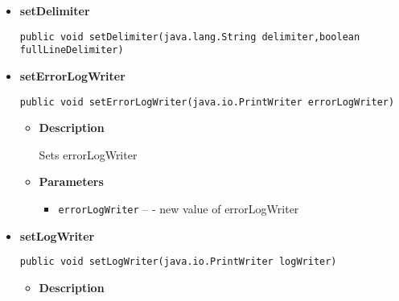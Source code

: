 \documentclass[
11pt, %
a4paper, %
oneside, %
headinclude,footinclude, %
BCOR5mm, %
]{scrartcl}
\begin{document}
\begin{appendices}
{{{{{{{{{{{{{{\begin{itemize}
{\begin{itemize}
{runs the SQL script, which is read in using Reader
}
\item{
{\bf  Parameters}
  \begin{itemize}
   \item{
\texttt{reader} -- - source of the script}
  \end{itemize}
}%
\item{{\bf  Throws}
}%
\end{itemize}
}%
\item{ 
\hypertarget{kitordersystem.ScriptReader.setDelimiter(java.lang.String, boolean)}{{\bf  setDelimiter}\\}
\begin{lstlisting}[frame=none]
public void setDelimiter(java.lang.String delimiter,boolean fullLineDelimiter)\end{lstlisting} %
}%
\item{ 
\hypertarget{kitordersystem.ScriptReader.setErrorLogWriter(java.io.PrintWriter)}{{\bf  setErrorLogWriter}\\}
\begin{lstlisting}[frame=none]
public void setErrorLogWriter(java.io.PrintWriter errorLogWriter)\end{lstlisting} %
\begin{itemize}
\item{
{\bf  Description}

Sets errorLogWriter
}
\item{
{\bf  Parameters}
  \begin{itemize}
   \item{
\texttt{errorLogWriter} -- - new value of errorLogWriter}
  \end{itemize}
}%
\end{itemize}
}%
\item{ 
\hypertarget{kitordersystem.ScriptReader.setLogWriter(java.io.PrintWriter)}{{\bf  setLogWriter}\\}
\begin{lstlisting}[frame=none]
public void setLogWriter(java.io.PrintWriter logWriter)\end{lstlisting} %
\begin{itemize}
\item{
{\bf  Description}

}
\end{itemize}}
\end{itemize}}}}}}}}}}}}}}}
\end{appendices}
\end{document}
